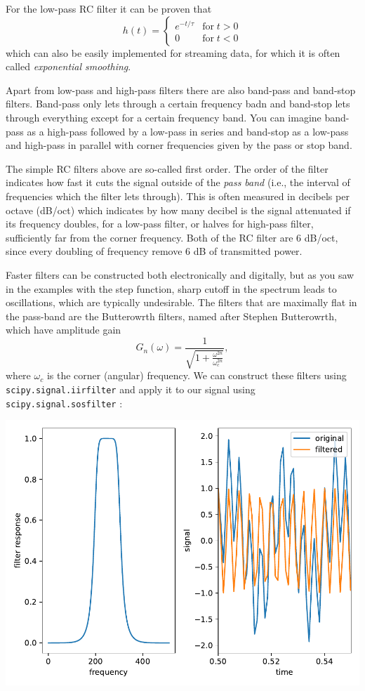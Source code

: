 \documentclass{article}
\newcommand{\ls}[1]{\lstinline{#1}}
\begin{document}
For the low-pass RC filter it can be proven that
\begin{equation}
    h(t) = \left\{\begin{matrix}
        e^{-t/\tau} & \mathrm{for}\; t > 0 \\
        0 & \mathrm{for}\; t < 0
    \end{matrix}\right.
\end{equation}
which can also be easily implemented for streaming data, for which it is often called \emph{exponential smoothing}.

Apart from low-pass and high-pass filters there are also band-pass and band-stop filters. Band-pass only lets through a certain frequency badn and band-stop lets through everything except for a certain frequency band. You can imagine band-pass as a high-pass followed by a low-pass in series and band-stop as a low-pass and high-pass in parallel with corner frequencies given by the pass or stop band. 

The simple RC filters above are so-called first order. The order of the filter indicates how fast it cuts the signal outside of the \emph{pass band} (i.e., the interval of frequencies which the filter lets through). This is often measured in decibels per octave (dB/oct) which indicates by how many decibel is the signal attenuated if its frequency doubles, for a low-pass filter, or halves for high-pass filter, sufficiently far from the corner frequency. Both of the RC filter are 6 dB/oct, since every doubling of frequency remove 6 dB of transmitted power.

Faster filters can be constructed both electronically and digitally, but as you saw in the examples with the step function, sharp cutoff in the spectrum leads to oscillations, which are typically undesirable. The filters that are maximally flat in the pass-band are the Butterowrth filters, named after Stephen Butterowrth, which have amplitude gain
\begin{equation*}
    G_n(\omega) = \frac{1}{\sqrt{1 + \frac{\omega^{2n}}{\omega_c^{2n}}}},
\end{equation*}
where $\omega_c$ is the corner (angular) frequency. We can construct these filters using \ls{scipy.signal.iirfilter} and apply it to our signal using \ls{scipy.signal.sosfilter}
:
\begin{center}
    \includegraphics[width=0.5\linewidth]{butter.pdf}
\end{center}
\end{document}
